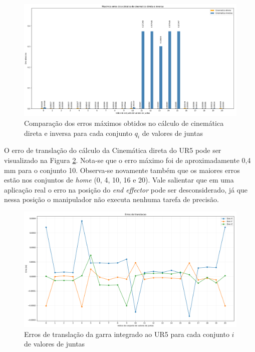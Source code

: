 \begin{figure}[htp]
	\centering
	\caption{Comparação dos erros máximos obtidos no cálculo de cinemática direta e inversa
		para cada conjunto $q_{i}$ de valores de juntas
	}
	\label{fig:grafico-maximo-erros}
	\includegraphics[width=\textwidth]{images/maximos_erros.png}
\end{figure}

O erro de translação do cálculo da Cinemática direta do UR5 pode ser visualizado na Figura \ref{fig:grafico-erro-transalacao}.
Nota-se que o erro máximo foi de aproximadamente 0,4 mm para o conjunto 10. Observa-se novamente também que os maiores erros estão nos conjuntos
de \textit{home} (0, 4, 10, 16 e 20). Vale salientar que em uma aplicação real o erro na posição do \textit{end effector} pode ser
desconsiderado, já que nessa posição o manipulador não executa nenhuma tarefa de precisão.

\begin{figure}[htp]
	\centering
	\caption{Erros de translação da garra integrado ao UR5 para cada conjunto $i$ de valores de juntas}
	\label{fig:grafico-erro-transalacao}
	\includegraphics[width=\textwidth]{images/erros_de_translacao.png}
\end{figure}

